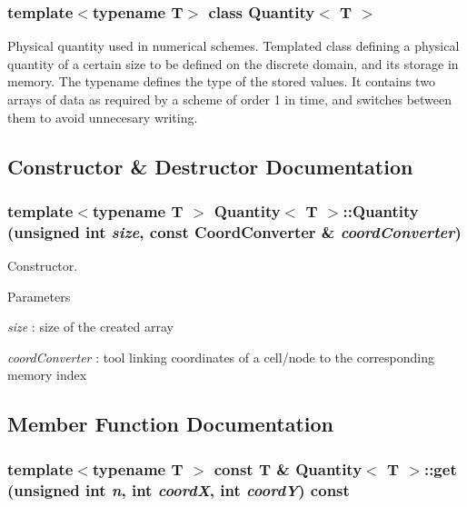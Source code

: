 \subsubsection*{template$<$typename T$>$ class Quantity$<$ T $>$}

Physical quantity used in numerical schemes. Templated class defining a physical quantity of a certain size to be defined on the discrete domain, and its storage in memory. The typename defines the type of the stored values. It contains two arrays of data as required by a scheme of order 1 in time, and switches between them to avoid unnecesary writing. 

\subsection{Constructor \& Destructor Documentation}
\hypertarget{classQuantity_ab07b278cfe453e82756684b1730efc95}{
\subsubsection[{Quantity}]{\setlength{\rightskip}{0pt plus 5cm}template$<$typename T $>$ {\bf Quantity}$<$ T $>$::{\bf Quantity} (unsigned int {\em size}, \/  const {\bf CoordConverter} \& {\em coordConverter})}}
\label{classQuantity_ab07b278cfe453e82756684b1730efc95}


Constructor. 
\begin{DoxyParams}{Parameters}
\item[{\em size}]: size of the created array \item[{\em coordConverter}]: tool linking coordinates of a cell/node to the corresponding memory index \end{DoxyParams}


\subsection{Member Function Documentation}
\hypertarget{classQuantity_a11f51450ca261ffa788f08fe29aecddf}{
\subsubsection[{get}]{\setlength{\rightskip}{0pt plus 5cm}template$<$typename T $>$ const T \& {\bf Quantity}$<$ T $>$::get (unsigned int {\em n}, \/  int {\em coordX}, \/  int {\em coordY}) const}}
\label{classQuantity_a11f51450ca261ffa788f08fe29aecddf}


